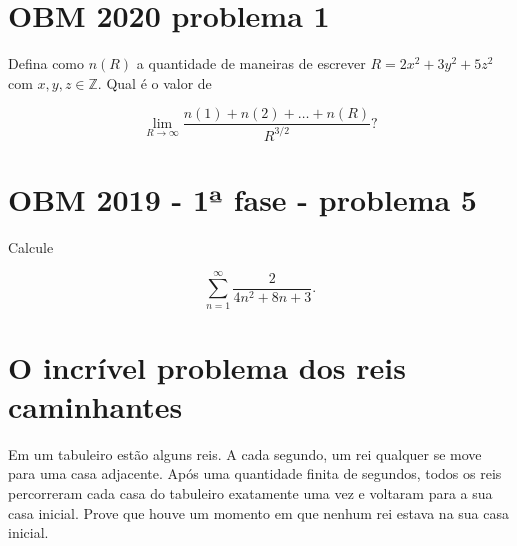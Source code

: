\section{OBM 2020 problema 1}

Defina como $n(R)$ a quantidade de maneiras de escrever $R=2x^2+3y^2+5z^2$ com $x,y,z\in\mathbb{Z}$. Qual é o valor de

$$\lim_{R\to\infty}\frac{n(1)+n(2)+\dots+n(R)}{R^{3/2}}?$$

\section{OBM 2019 - 1ª fase - problema 5}

Calcule

$$\sum_{n=1}^\infty\frac{2}{4n^2+8n+3}.$$

\section{O incrível problema dos reis caminhantes}

Em um tabuleiro estão alguns reis. A cada segundo, um rei qualquer se move para uma casa adjacente. Após uma quantidade finita de segundos, todos os reis percorreram cada casa do tabuleiro exatamente uma vez e voltaram para a sua casa inicial. Prove que houve um momento em que nenhum rei estava na sua casa inicial.